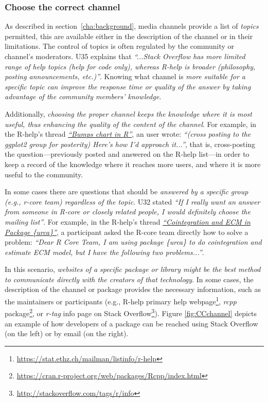 \documentclass{sig-alternate-05-2015}
\begin{document}
	\subsubsection{Choose the correct channel}

		As described in section~\ref{cha:background}, media channels provide a list of \textit{topics} permitted, this are available either in the description of the channel or in their limitations.
		The control of topics is often regulated by the community or channel's moderators.
		U35 explains that \textit{``...Stack Overflow has more limited range of help topics (help for code only), whereas R-help is broader (philosophy, posting announcements, etc.)''}.
		Knowing what channel is \emph{more suitable for a specific topic can improve the response time or quality of the answer by taking advantage of the community members' knowledge}.

		Additionally, \emph{choosing the proper channel keeps the knowledge where it is most useful, thus enhancing the quality of the content of the channel}.
		For example, in the R-help's thread \textit{\href{http://goo.gl/EJHWrs}{``Bumps chart in R''}}, an user wrote: \textit{``(cross posting to the ggplot2 group for posterity) Here's how I'd approach it...''}, that is, cross-posting the question---previously posted and answered on the R-help list---in order to keep a record of the knowledge where it reaches more users, and where it is more useful to the community.

		In some cases there are questions that should be \emph{answered by a \textit{specific group} (e.g., r-core team) regardless of the topic}.
		U32 stated \textit{``If I really want an answer from someone in R-core or closely related people, I would definitely choose the mailing list''}.
		For example, in the R-help's thread \textit{\href{http://goo.gl/7olLv7}{``Cointegration and ECM in Package \{urca\}''}}, a participant asked the R-core team directly how to solve a problem: \textit{``Dear R Core Team, I am using package \{urca\} to do cointegration and estimate ECM model, but I have the following two problems...''}.

		In this scenario, \emph{websites of a specific package or library might be the best method to communicate directly with the creators of that technology}.
		In some cases, the description of the channel or package provides the necessary information, such as the maintainers or participants (e.g., R-help primary help webpage\footnote{\url{https://stat.ethz.ch/mailman/listinfo/r-help}}, \emph{rcpp} package\footnote{\url{https://cran.r-project.org/web/packages/Rcpp/index.html}}, or \textit{r-tag} info page on Stack Overflow\footnote{\url{http://stackoverflow.com/tags/r/info}}).
		Figure \ref{fig:CCchannel} depicts an example of how developers of a package can be reached using Stack Overflow (on the left) or by email (on the right). 
\end{document}
